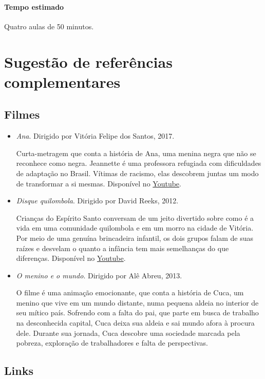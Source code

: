 \documentclass[11pt]{extarticle}
\begin{document}
\paragraph{Tempo estimado} Quatro aulas de 50 minutos.

\section{Sugestão de referências complementares}

\subsection{Filmes}

\begin{itemize}

\item \textit{Ana}. Dirigido por Vitória Felipe dos Santos, 2017.

Curta-metragem que conta a história de Ana, uma menina negra que não se reconhece como negra. Jeannette é uma professora refugiada com dificuldades de adaptação no Brasil. Vítimas de racismo, elas descobrem juntas um modo de transformar a si mesmas. Disponível no \href{https://youtu.be/MO1f8n3gMG8}{Youtube}.

\item \textit{Disque quilombola}. Dirigido por David Reeks, 2012.

Crianças do Espírito Santo conversam de um jeito divertido sobre como é a vida em uma comunidade quilombola e em um morro na cidade de Vitória. Por meio de uma genuína brincadeira infantil, os dois grupos falam de suas raízes e desvelam o quanto a infância tem mais semelhanças do que diferenças. Disponível no \href{https://youtu.be/GStv-f_bcfU}{Youtube}.

\item \textit{O menino e o mundo}. Dirigido por Alê Abreu, 2013.

O filme é uma animação emocionante, que conta a história de Cuca, um menino que vive em um mundo distante, numa pequena aldeia no interior de seu mítico país. Sofrendo com a falta do pai, que parte em busca de trabalho na desconhecida capital, Cuca deixa sua aldeia e sai mundo afora à procura dele. Durante sua jornada, Cuca descobre uma sociedade marcada pela pobreza, exploração de trabalhadores e falta de perspectivas.

\end{itemize}

\subsection{Links}
\end{document}
